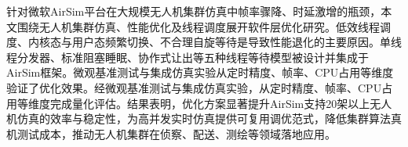 
\begin{abstractzh}

针对微软AirSim平台在大规模无人机集群仿真中帧率骤降、时延激增的瓶颈，本文围绕无人机集群仿真、性能优化及线程调度展开软件层优化研究。低效线程调度、内核态与用户态频繁切换、不合理自旋等待是导致性能退化的主要原因。单线程分发器、标准阻塞睡眠、协作式让出等五种线程等待模型被设计并集成于AirSim框架。微观基准测试与集成仿真实验从定时精度、帧率、CPU占用等维度验证了优化效果。经微观基准测试与集成仿真实验，从定时精度、帧率、CPU占用等维度完成量化评估。结果表明，优化方案显著提升AirSim支持20架以上无人机仿真的效率与稳定性，为高并发实时仿真提供可复用调优范式，降低集群算法真机测试成本，推动无人机集群在侦察、配送、测绘等领域落地应用。

\end{abstractzh}
